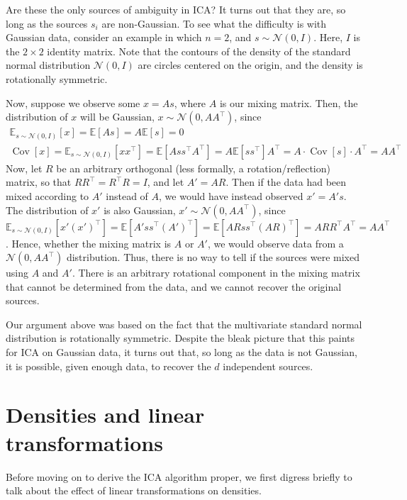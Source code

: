 Are these the only sources of ambiguity in ICA? It turns out that they
are, so long as the sources $s_i$ are non-Gaussian. To see what the difficulty is
with Gaussian data, consider an example in which $n = 2$, and $s \sim \mathcal N(0,I)$.
Here, $I$ is the $2\times2$ identity matrix. Note that the contours of the density of
the standard normal distribution $\mathcal N(0,I)$ are circles centered on the origin,
and the density is rotationally symmetric.

Now, suppose we observe some $x = As$, where $A$ is our mixing matrix.
Then, the distribution of $x$ will be Gaussian, $x \sim \mathcal N(0,AA^\top)$, since
\begin{gather*}
    \mathbb E_{s\sim \mathcal N(0,I)}[x] = \mathbb E[As] = A\mathbb E[s] = 0\\
    \operatorname{Cov}[x] = \mathbb E_{s\sim \mathcal N(0,I)}[xx^\top] = \mathbb E[Ass^\top A^\top] = A\mathbb E[ss^\top]A^\top = A \cdot \operatorname{Cov}[s] \cdot A^\top = AA^\top
\end{gather*}
Now, let $R$ be an arbitrary orthogonal (less formally, a rotation/reflection)
matrix, so that $RR^\top = R^\top R = I$, and let $A' = AR$. Then if the data had
been mixed according to $A'$ instead of $A$, we would have instead observed
$x' = A's$. The distribution of $x'$ is also Gaussian, $x' \sim \mathcal N(0,AA^\top)$, since
$\mathbb E_{s\sim \mathcal N(0,I)}[x' (x' )^\top] = \mathbb E[A' ss^\top(A')^\top] = \mathbb E[ARss^\top(AR)^\top] = ARR^\top A^\top = AA^\top$.
Hence, whether the mixing matrix is $A$ or $A'$, we would observe data from
a $\mathcal N(0,AA^\top)$ distribution. Thus, there is no way to tell if the sources were
mixed using $A$ and $A'$. There is an arbitrary rotational component in the
mixing matrix that cannot be determined from the data, and we cannot
recover the original sources.

Our argument above was based on the fact that the multivariate standard
normal distribution is rotationally symmetric. Despite the bleak picture that
this paints for ICA on Gaussian data, it turns out that, so long as the data is
not Gaussian, it is possible, given enough data, to recover the $d$ independent
sources.


\section{Densities and linear transformations}
Before moving on to derive the ICA algorithm proper, we first digress briefly
to talk about the effect of linear transformations on densities.

